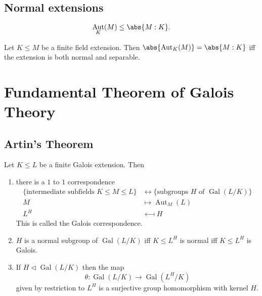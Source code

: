 \documentclass{article}
\DeclareMathOperator{\Aut}{Aut}
\DeclareMathOperator{\Gal}{Gal}
\begin{document}
\subsection{Normal extensions}









\begin{nlemma}\label{lem:2.23}
    \begin{equation*}
        \Aut_K(M) \leq \abs{M:K}.
    \end{equation*}
\end{nlemma}

\begin{nthm}\label{thm:2.24}
    Let $K \leq M$ be a finite field extension.
    Then $\abs{\Aut_K(M)} = \abs{M:K}$ iff the extension is both normal and separable.
\end{nthm}







\clearpage
\section{Fundamental Theorem of Galois Theory}
\subsection{Artin's Theorem}


\begin{nthm}\label{thm:3.2}
    Let $K \leq L$ be a finite Galois extension.
    Then
    \begin{enumerate}[label=(\roman*)]
        \item there is a $1$ to $1$ correspondence
            \begin{align*}
                \{\text{intermediate subfields }K \leq M \leq L\} &\longleftrightarrow \{\text{subgroups $H$ of } \Gal(L/K)\} \\
                M &\longmapsto \Aut_M(L) \\
                L^H &\longmapsfrom H
            \end{align*}
            This is called the Galois correspondence.
        \item $H$ is a normal subgroup of $\Gal(L/K)$ iff $K \leq L^H$ is normal iff $K \leq L^H$ is Galois.
        \item If $H \lhd \Gal(L/K)$ then the map
            \begin{equation*}
                \theta: \Gal(L/K) \longrightarrow \Gal(L^H/K)
            \end{equation*}
            given by restriction to $L^H$ is a surjective group homomorphism with kernel $H$.
    \end{enumerate}
\end{nthm}
\end{document}
